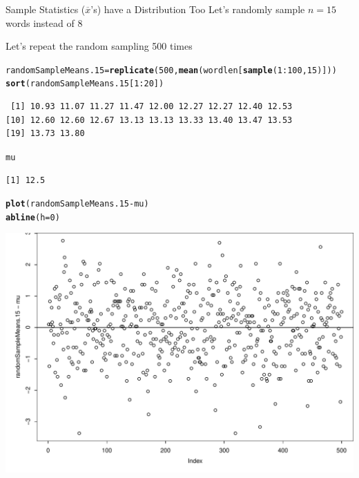 \documentclass{beamer}\usepackage[]{graphicx}\usepackage[]{color}
\makeatletter
\newcommand{\hlnum}[1]{\textcolor[rgb]{0.2,0.2,0.2}{#1}}%
\newcommand{\hlopt}[1]{\textcolor[rgb]{0.102,0.102,0.102}{#1}}%
\newcommand{\hlstd}[1]{\textcolor[rgb]{0.102,0.102,0.102}{#1}}%
\newcommand{\hlkwb}[1]{\textcolor[rgb]{0.102,0.102,0.102}{#1}}%
\newcommand{\hlkwc}[1]{\textcolor[rgb]{0.2,0.2,0.2}{#1}}%
\newcommand{\hlkwd}[1]{\textcolor[rgb]{0.102,0.102,0.102}{\textbf{#1}}}%
\newenvironment{kframe}{%
 \def\at@end@of@kframe{}%
 \ifinner\ifhmode%
  \def\at@end@of@kframe{\end{minipage}}%
  \begin{minipage}{\columnwidth}%
 \fi\fi%
 \def\FrameCommand##1{\hskip\@totalleftmargin \hskip-\fboxsep
 \colorbox{shadecolor}{##1}\hskip-\fboxsep
     \hskip-\linewidth \hskip-\@totalleftmargin \hskip\columnwidth}%
 \MakeFramed {\advance\hsize-\width
   \@totalleftmargin\z@ \linewidth\hsize
   \@setminipage}}%
 {\par\unskip\endMakeFramed%
 \at@end@of@kframe}
\newenvironment{knitrout}{}{} %
\renewenvironment{knitrout}{\begin{spacing}{0.75}\begin{tiny}}{\end{tiny}\end{spacing}}
\newcommand{\xbar}{\overline{x}}
\makeatother
\begin{document}
\begin{frame}{Sample Statistics ($\xbar$'s) have a Distribution Too\;\;}
Let's randomly sample $n=15$ words instead of 8

Let's repeat the random sampling 500 times

\begin{knitrout}\small
{}\color{fgcolor}\begin{kframe}
\begin{alltt}
\hlstd{randomSampleMeans.15} \hlkwb{=} \hlkwd{replicate}\hlstd{(}\hlnum{500}\hlstd{,} \hlkwd{mean}\hlstd{(wordlen[}\hlkwd{sample}\hlstd{(}\hlnum{1}\hlopt{:}\hlnum{100}\hlstd{,}\hlnum{15}\hlstd{)]) )}
\hlkwd{sort}\hlstd{(randomSampleMeans.15[}\hlnum{1}\hlopt{:}\hlnum{20}\hlstd{])}
\end{alltt}
\begin{verbatim}
 [1] 10.93 11.07 11.27 11.47 12.00 12.27 12.27 12.40 12.53
[10] 12.60 12.60 12.67 13.13 13.13 13.33 13.40 13.47 13.53
[19] 13.73 13.80
\end{verbatim}
\begin{alltt}
\hlstd{mu}
\end{alltt}
\begin{verbatim}
[1] 12.5
\end{verbatim}
\begin{alltt}
\hlkwd{plot}\hlstd{(randomSampleMeans.15} \hlopt{-} \hlstd{mu)}
\hlkwd{abline}\hlstd{(}\hlkwc{h}\hlstd{=}\hlnum{0}\hlstd{)}
\end{alltt}
\end{kframe}

{\centering \includegraphics[width=0.99\linewidth]{figure/graphics-unnamed-chunk-42-1} 

}




\end{knitrout}
\end{frame}
\end{document}
